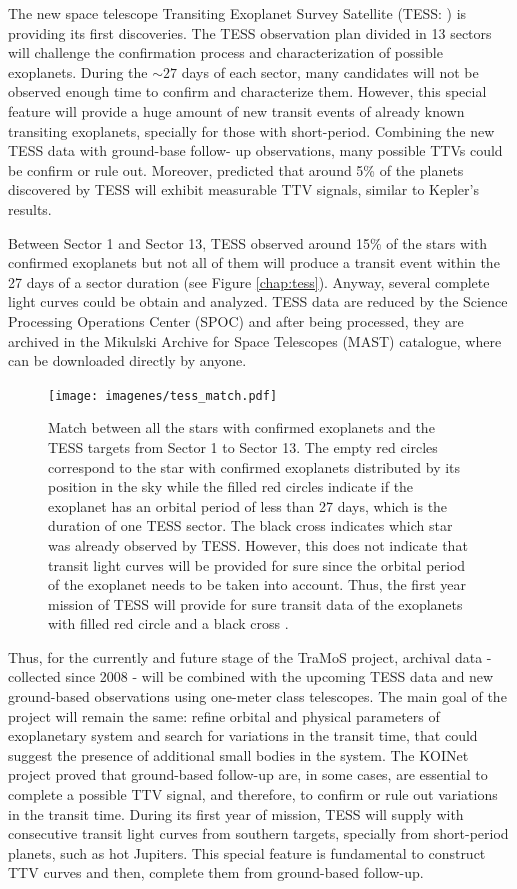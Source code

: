 The new space telescope Transiting Exoplanet Survey Satellite (TESS: \cite{Ricker2014}) is providing its first discoveries. The TESS observation plan divided in 13 sectors will challenge the confirmation process and characterization of possible exoplanets. During the $\sim27$ days of each sector, many candidates will not be observed enough time to confirm and characterize them. However, this special feature will provide a huge amount of new transit events of already known transiting exoplanets, specially for those with short-period. Combining the new TESS data with ground-base follow- up observations, many possible TTVs could be confirm or rule out. Moreover, \cite{Ballard2018} predicted that around 5\% of the planets discovered by TESS will exhibit measurable TTV signals, similar to Kepler’s results.

Between Sector 1 and Sector 13, TESS observed around 15\% of the stars with confirmed exoplanets but not all of them will produce a transit event within the 27 days of a sector duration (see Figure \ref{chap:tess}). Anyway, several complete light curves could be obtain and analyzed. TESS data are reduced by the Science Processing Operations Center (SPOC) and after being processed, they are archived in the Mikulski Archive for Space Telescopes (MAST) catalogue, where can be downloaded directly by anyone. 

\begin{figure}
\centering
\texttt{[image: imagenes/tess\_match.pdf]}
\caption{Match between all the stars with confirmed exoplanets and the TESS targets from Sector 1 to Sector 13. The empty red circles correspond to the star with confirmed exoplanets distributed by its position in the sky while the filled red circles indicate if the exoplanet has an orbital period of less than 27 days, which is the duration of one TESS sector. The black cross indicates which star was already observed by TESS. However, this does not indicate that transit light curves will be provided for sure since the orbital period of the exoplanet needs to be taken into account. Thus, the first year mission of TESS will provide for sure transit data of the exoplanets with filled red circle and a black cross .}
\label{match_tess}
\end{figure}

Thus, for the currently and future stage of the TraMoS project, archival data - collected since 2008 - will be combined with the upcoming TESS data and new ground-based observations using one-meter class telescopes. The main goal of the project will remain the same: refine orbital and physical parameters of exoplanetary system and search for variations in the transit time, that could suggest the presence of additional small bodies in the system.  The KOINet project proved that ground-based follow-up are, in some cases, are essential to complete a possible TTV signal, and therefore, to confirm or rule out variations in the transit time. During its first year of mission, TESS will supply with consecutive transit light curves from southern targets, specially from short-period planets, such as hot Jupiters. This special feature is fundamental to construct TTV curves and then, complete them from ground-based follow-up.

